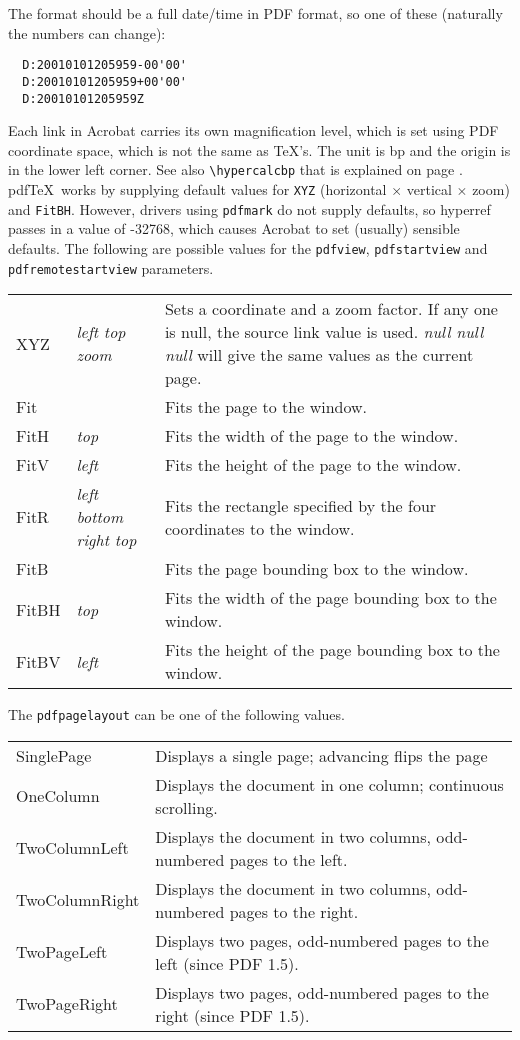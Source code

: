\documentclass{article}
\newcommand*{\xpackage}[1]{\textsf{#1}}
\begin{document}
 The format should be a full date/time in PDF format, so one of these (naturally
 the numbers can change):
 \begin{verbatim}
  D:20010101205959-00'00'
  D:20010101205959+00'00'
  D:20010101205959Z
 \end{verbatim}

Each link in Acrobat carries its own magnification level, which is set
using PDF coordinate space, which is not the same as \TeX's. The unit
is bp and the origin is in the lower left corner. See also
\verb|\hypercalcbp| that is explained on page \pageref{hypercalcbp}.
pdf\TeX\
works by supplying default values for \texttt{XYZ} (horizontal $\times$
vertical $\times$ zoom) and \texttt{FitBH}. However, drivers using
\texttt{pdfmark} do not supply defaults, so \xpackage{hyperref} passes in
a value of -32768, which causes Acrobat to set (usually) sensible
defaults. The following are possible values for the \texttt{pdfview},
\texttt{pdfstartview} and \texttt{pdfremotestartview} parameters.

\begin{longtable}{@{}>{\ttfamily}l>{\itshape}lp{7cm}@{}}
XYZ   & left top zoom         & Sets a coordinate and a zoom factor. If any one is null, the source link value is used.
                                \textit{null null null} will give the same values as the current page. \\
Fit   &                       & Fits the page to the window. \\
FitH  & top                   & Fits the width of the page to the window. \\
FitV  & left                  & Fits the height of the page to the window. \\
FitR  & left bottom right top & Fits the rectangle specified by the four coordinates to the window. \\
FitB  &                       & Fits the page bounding box to the window. \\
FitBH & top                   & Fits the width of the page bounding box to the window. \\
FitBV & left                  & Fits the height of the page bounding box to the window. \\
\end{longtable}

The \texttt{pdfpagelayout} can be one of the following values.

\begin{longtable}{@{}>{\ttfamily}lp{10cm}@{}}
SinglePage     & Displays a single page; advancing flips the page \\
OneColumn      & Displays the document in one column; continuous scrolling. \\
TwoColumnLeft  & Displays the document in two columns, odd-numbered pages to the left. \\
TwoColumnRight & Displays the document in two columns, odd-numbered pages to the right.\\
TwoPageLeft    & Displays two pages, odd-numbered pages to the left (since PDF 1.5).\\
TwoPageRight   & Displays two pages, odd-numbered pages to the right (since PDF 1.5).
\end{longtable}
\end{document}
